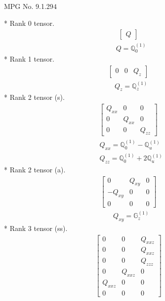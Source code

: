 \documentclass[fleqn,8pt,landscape]{jsarticle}
\begin{document}
\setcounter{MaxMatrixCols}{32}

\renewcommand{\tablename}{Table~}
\renewcommand{\figurename}{Figure~}
\begin{center}
\LARGE
MPG No. 9.1.29\quad$4$
\end{center}
* Rank 0 tensor.
\begin{align*}
\begin{bmatrix} Q \end{bmatrix}
\end{align*}
\begin{align*}
& Q = \mathbb{Q}_{0}^{(1)}
\end{align*}
* Rank 1 tensor.
\begin{align*}
\begin{bmatrix} 0 & 0 & Q_{z} \end{bmatrix}
\end{align*}
\begin{align*}
& Q_{z} = \mathbb{Q}_{z}^{(1)}
\end{align*}
* Rank 2 tensor (s).
\begin{align*}
\begin{bmatrix} Q_{xx} & 0 & 0 \\ 0 & Q_{xx} & 0 \\ 0 & 0 & Q_{zz} \end{bmatrix}
\end{align*}
\begin{align*}
& Q_{xx} = \mathbb{Q}_{0}^{(1)} - \mathbb{Q}_{u}^{(1)} \\
& Q_{zz} = \mathbb{Q}_{0}^{(1)} + 2 \mathbb{Q}_{u}^{(1)}
\end{align*}
* Rank 2 tensor (a).
\begin{align*}
\begin{bmatrix} 0 & Q_{xy} & 0 \\ - Q_{xy} & 0 & 0 \\ 0 & 0 & 0 \end{bmatrix}
\end{align*}
\begin{align*}
& Q_{xy} = \mathbb{G}_{z}^{(1)}
\end{align*}
* Rank 3 tensor (ss).
\begin{align*}
\begin{bmatrix} 0 & 0 & Q_{xxz} \\ 0 & 0 & Q_{xxz} \\ 0 & 0 & Q_{zzz} \\ 0 & Q_{xxz} & 0 \\ Q_{xxz} & 0 & 0 \\ 0 & 0 & 0 \end{bmatrix}
\end{align*}
\end{document}
